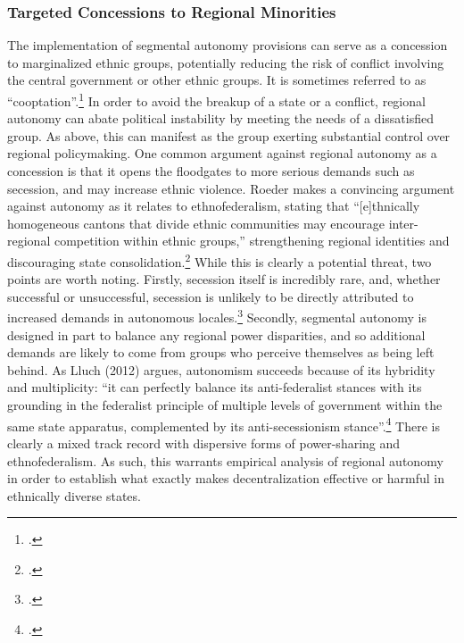 \documentclass[12pt]{article}
\begin{document}
\subsubsection{Targeted Concessions to Regional Minorities}
The implementation of segmental autonomy provisions can serve as a concession to marginalized ethnic groups, potentially reducing the risk of conflict involving the central government or other ethnic groups. It is sometimes referred to as ``cooptation''.\footcite{seely_political_2001} In order to avoid the breakup of a state or a conflict, regional autonomy can abate political instability by meeting the needs of a dissatisfied group. As above, this can manifest as the group exerting substantial control over regional policymaking. One common argument against regional autonomy as a concession is that it opens the floodgates to more serious demands such as secession, and may increase ethnic violence. Roeder makes a convincing argument against autonomy as it relates to ethnofederalism, stating that ``[e]thnically homogeneous cantons that divide ethnic communities may encourage inter-regional competition within ethnic groups,'' strengthening regional identities and discouraging state consolidation.\footcite[219]{roeder_ethnofederalism_2009} While this is clearly a potential threat, two points are worth noting. Firstly, secession itself is incredibly rare, and, whether successful or unsuccessful, secession is unlikely to be directly attributed to increased demands in autonomous locales.\footcite{mehler_consociationalism_2013, roeder_secessionism_2014} Secondly, segmental autonomy is designed in part to balance any regional power disparities, and so additional demands are likely to come from groups who perceive themselves as being left behind. As Lluch (2012) argues, autonomism succeeds because of its hybridity and multiplicity: ``it can perfectly balance its anti-federalist stances with its grounding in the federalist principle of multiple levels of government within the same state apparatus, complemented by its anti-secessionism stance''.\footcite[155]{lluch_autonomism_2012} There is clearly a mixed track record with dispersive forms of power-sharing and ethnofederalism. As such, this warrants empirical analysis of regional autonomy in order to establish what exactly makes decentralization effective or harmful in ethnically diverse states. 
\end{document}
